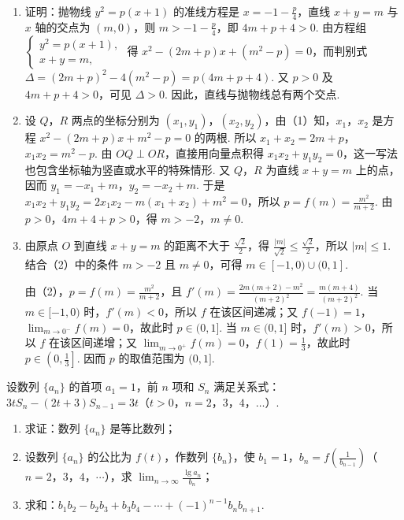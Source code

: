 \documentclass[UTF8,a4paper,oneside,11pt]{ctexbook}
\begin{document}
\begin{solution}

\begin{enumerate}
\item
证明：抛物线 \(y^2=p(x+1)\) 的准线方程是 \(x=-1-\frac{p}{4}\)，直线 \(x+y=m\) 与 \(x\) 轴的交点为 \((m,0)\)，则 \(m>-1-\frac{p}{4}\)，即 \(4m+p+4>0\). 由方程组 \(\begin{cases}
y^2=p(x+1),\\
x+y=m,
\end{cases}\) 得 \(x^2-(2m+p)x+(m^2-p)=0\)，而判别式 \(\Delta=(2m+p)^2-4(m^2-p)=p(4m+p+4)\). 又 \(p>0\) 及 \(4m+p+4>0\)，可见 \(\Delta>0\). 因此，直线与抛物线总有两个交点.

\item 设 \(Q\)，\(R\) 两点的坐标分别为 \((x_1,y_1)\)，\((x_2,y_2)\)，由（1）知，\(x_1\)，\(x_2\) 是方程 \(x^2-(2m+p)x+m^2-p=0\) 的两根. 所以 \(x_1+x_2=2m+p\)，\(x_1x_2=m^2-p\). 由 \(OQ \perp OR\)，直接用向量点积得 \(x_1x_2+y_1y_2=0\)，这一写法也包含坐标轴为竖直或水平的特殊情形. 又 \(Q\)，\(R\) 为直线 \(x+y=m\) 上的点，因而 \(y_1=-x_1+m\)，\(y_2=-x_2+m\). 于是 \(x_1x_2+y_1y_2=2x_1x_2-m(x_1+x_2)+m^2=0\)，所以 \(p=f(m)=\frac{m^2}{m+2}\). 由 \(p>0\)，\(4m+4+p>0\)，得 \(m>-2\)，\(m \neq 0\).

\item 由原点 \(O\) 到直线 \(x+y=m\) 的距离不大于 \(\frac{\sqrt{2}}{2}\)，得 \(\frac{|m|}{\sqrt{2}}\leqslant\frac{\sqrt{2}}{2}\)，所以 \(|m|\leqslant1\). 结合（2）中的条件 \(m>-2\) 且 \(m\neq0\)，可得 \(m\in[-1,0)\cup(0,1]\).

由（2），\(p=f(m)=\frac{m^2}{m+2}\)，且
\(f'(m)=\frac{2m(m+2)-m^2}{(m+2)^2}=\frac{m(m+4)}{(m+2)^2}\). 当 \(m\in[-1,0)\) 时，\(f'(m)<0\)，所以 \(f\) 在该区间递减；又 \(f(-1)=1\)，\(\displaystyle\lim_{m\to0^-}f(m)=0\)，故此时 \(p\in(0,1]\). 当 \(m\in(0,1]\) 时，\(f'(m)>0\)，所以 \(f\) 在该区间递增；又 \(\displaystyle\lim_{m\to0^+}f(m)=0\)，\(f(1)=\frac13\)，故此时 \(p\in\left(0,\frac13\right]\). 因而 \(p\) 的取值范围为 \((0,1]\).
\end{enumerate}
\end{solution}

\begin{problem}
设数列 \(\{a_n\}\) 的首项 \(a_1=1\)，前 \(n\) 项和 \(S_n\) 满足关系式：\(3tS_n-(2t+3)S_{n-1}=3t\)（\(t>0\)，\(n=2\)，\(3\)，\(4\)，\(\dots\)）.
\begin{enumerate}
\item 求证：数列 \(\{a_n\}\) 是等比数列；
\item 设数列 \(\{a_n\}\) 的公比为 \(f(t)\)，作数列 \(\{b_n\}\)，使 \(b_1=1\)，\(b_n=f\left(\frac{1}{b_{n-1}}\right)\)（\(n=2\)，\(3\)，\(4\)，\(\cdots\)），求 \(\displaystyle\lim_{n\to\infty}\frac{\lg a_n}{b_n}\)；
\item 求和：\(b_1b_2-b_2b_3+b_3b_4-\cdots+(-1)^{n-1}b_nb_{n+1}\).
\end{enumerate}
\end{problem}
\end{document}
